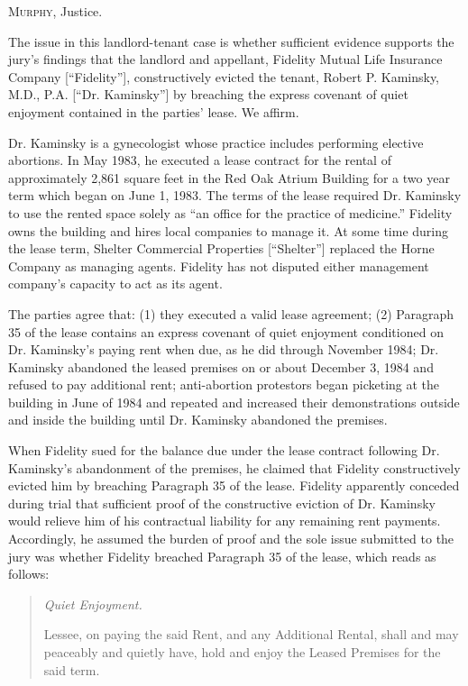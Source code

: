 

\textsc{Murphy}, Justice.

The issue in this landlord-tenant case is whether sufficient evidence supports
the jury's findings that the landlord and appellant, Fidelity Mutual Life
Insurance Company [``Fidelity''], constructively evicted the tenant, Robert P.
Kaminsky, M.D., P.A. [``Dr. Kaminsky''] by breaching the express covenant of
quiet enjoyment contained in the parties' lease. We affirm.

Dr. Kaminsky is a gynecologist whose practice includes performing elective
abortions. In May 1983, he executed a lease contract for the rental of
approximately 2,861 square feet in the Red Oak Atrium Building for a two year
term which began on June 1, 1983. The terms of the lease required Dr. Kaminsky
to use the rented space solely as ``an office for the practice of medicine.''
Fidelity owns the building and hires local companies to manage it. At some time
during the lease term, Shelter Commercial Properties [``Shelter''] replaced the
Horne Company as managing agents. Fidelity has not disputed either management
company's capacity to act as its agent.

The parties agree that: (1) they executed a valid lease agreement; (2) Paragraph
35 of the lease contains an express covenant of quiet enjoyment conditioned on
Dr. Kaminsky's paying rent when due, as he did through November 1984; Dr.
Kaminsky abandoned the leased premises on or about December 3, 1984 and refused
to pay additional rent; anti-abortion protestors began picketing at the
building in June of 1984 and repeated and increased their demonstrations
outside and inside the building until Dr. Kaminsky abandoned the premises.

When Fidelity sued for the balance due under the lease contract following Dr.
Kaminsky's abandonment of the premises, he claimed that Fidelity constructively
evicted him by breaching Paragraph 35 of the lease. Fidelity apparently
conceded during trial that sufficient proof of the constructive eviction of Dr.
Kaminsky would relieve him of his contractual liability for any remaining rent
payments. Accordingly, he assumed the burden of proof and the sole issue
submitted to the jury was whether Fidelity breached Paragraph 35 of the lease,
which reads as follows:

\begin{quote}

\emph{Quiet Enjoyment.}

Lessee, on paying the said Rent, and any Additional Rental, shall and may
peaceably and quietly have, hold and enjoy the Leased Premises for the said
term.
\end{quote}

